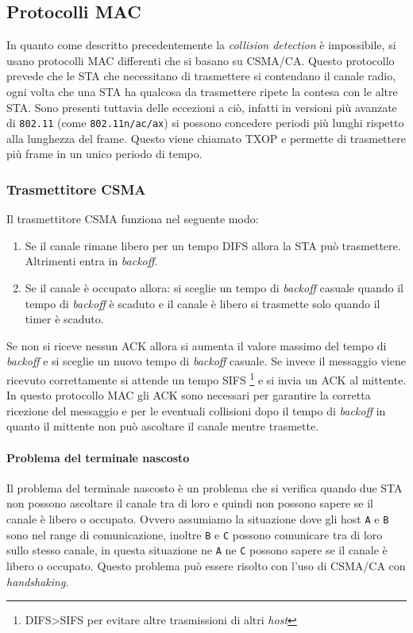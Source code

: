     \subsection[Protocolli \texttt{MAC}]{Protocolli \Acrshort*{MAC}}
        In quanto come descritto precedentemente la \textit{collision detection} è impossibile, si usano protocolli \Acrshort*{MAC} differenti che si basano su \Acrfull*{CSMA/CA}. Questo protocollo prevede che le \Acrshort*{STA} che necessitano di trasmettere si contendano il canale radio, ogni volta che una \Acrshort*{STA} ha qualcosa da trasmettere ripete la contesa con le altre \Acrshort*{STA}. Sono presenti tuttavia delle eccezioni a ciò, infatti in versioni più avanzate di \texttt{802.11} (come \texttt{802.11n/ac/ax}) si possono concedere periodi più lunghi rispetto alla lunghezza del frame. Questo viene chiamato \Acrfull*{TXOP} e permette di trasmettere più frame in un unico periodo di tempo.
        \subsubsection{Trasmettitore \Acrshort*{CSMA}}
            Il trasmettitore \Acrshort*{CSMA} funziona nel seguente modo:
            \begin{enumerate}
                \item Se il canale rimane libero per un tempo \acrfull*{DIFS} allora la \Acrshort*{STA} può trasmettere. Altrimenti entra in \textit{backoff}.
                \item Se il canale è occupato allora:
                    \subitem si sceglie un tempo di \textit{backoff} casuale
                    \subitem quando il tempo di \textit{backoff} è scaduto e il canale è libero si trasmette solo quando il timer è scaduto.
            \end{enumerate}
            Se non si riceve nessun \Acrshort*{ACK} allora si aumenta il valore massimo del tempo di \textit{backoff} e si sceglie un nuovo tempo di \textit{backoff} casuale.\newline
            Se invece il messaggio viene ricevuto correttamente si attende un tempo \acrfull*{SIFS} \footnote{\Acrshort*{DIFS}>\Acrshort{SIFS} per evitare altre trasmissioni di altri \textit{host}} e si invia un \Acrshort*{ACK} al mittente. In questo protocollo \Acrshort*{MAC} gli \Acrshort*{ACK} sono necessari per garantire la corretta ricezione del messaggio e per le eventuali collisioni dopo il tempo di \textit{backoff} in quanto il mittente non può ascoltare il canale mentre trasmette.
            \paragraph{Problema del terminale nascosto} Il problema del terminale nascosto è un problema che si verifica quando due \Acrshort*{STA} non possono ascoltare il canale tra di loro e quindi non possono sapere se il canale è libero o occupato. Ovvero assumiamo la situazione dove gli host \texttt{A} e \texttt{B} sono nel range di comunicazione, inoltre \texttt{B} e \texttt{C} possono comunicare tra di loro sullo stesso canale, in questa situazione ne \texttt{A} ne \texttt{C} possono sapere se il canale è libero o occupato. Questo problema può essere risolto con l'uso di \Acrshort*{CSMA/CA} con \textit{handshaking}.
